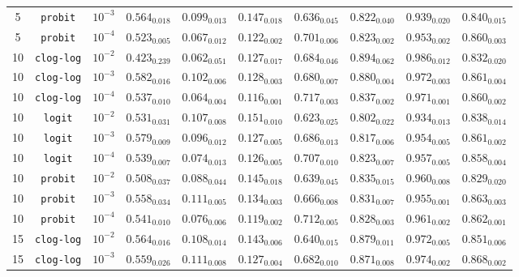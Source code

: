 \documentclass[preprint]{elsarticle}
\begin{document}
\begin{table}[!t]
{\begin{tabular}{c@{\hskip 0.15cm}c@{\hskip 0.15cm}c@{\hskip 0.15cm}c@{\hskip 0.15cm}c@{\hskip 0.15cm}c@{\hskip 0.15cm}c@{\hskip 0.15cm}c@{\hskip 0.15cm}c@{\hskip 0.15cm}c}
		5 & \texttt{probit} & $10^{-3}$ & $0.564_{0.018}$ & $0.099_{0.013}$ & $0.147_{0.018}$ & $0.636_{0.045}$ & $0.822_{0.040}$ & $0.939_{0.020}$ & $0.840_{0.015}$\\
		5 & \texttt{probit} & $10^{-4}$ & $0.523_{0.005}$ & $0.067_{0.012}$ & $0.122_{0.002}$ & $0.701_{0.006}$ & $0.823_{0.002}$ & $0.953_{0.002}$ & $0.860_{0.003}$\\
		10 & \texttt{clog-log} & $10^{-2}$ & $0.423_{0.239}$ & $0.062_{0.051}$ & $0.127_{0.017}$ & $0.684_{0.046}$ & $\mathbf{0.894_{0.062}}$ & $\mathbf{0.986_{0.012}}$ & $0.832_{0.020}$\\
		10 & \texttt{clog-log} & $10^{-3}$ & $\mathbf{0.582_{0.016}}$ & $0.102_{0.006}$ & $0.128_{0.003}$ & $0.680_{0.007}$ & $\mathit{0.880_{0.004}}$ & $0.972_{0.003}$ & $0.861_{0.004}$\\
		10 & \texttt{clog-log} & $10^{-4}$ & $0.537_{0.010}$ & $0.064_{0.004}$ & $\mathit{0.116_{0.001}}$ & $0.717_{0.003}$ & $0.837_{0.002}$ & $0.971_{0.001}$ & $0.860_{0.002}$\\
		10 & \texttt{logit} & $10^{-2}$ & $0.531_{0.031}$ & $0.107_{0.008}$ & $0.151_{0.010}$ & $0.623_{0.025}$ & $0.802_{0.022}$ & $0.934_{0.013}$ & $0.838_{0.014}$\\
		10 & \texttt{logit} & $10^{-3}$ & $0.579_{0.009}$ & $0.096_{0.012}$ & $0.127_{0.005}$ & $0.686_{0.013}$ & $0.817_{0.006}$ & $0.954_{0.005}$ & $0.861_{0.002}$\\
		10 & \texttt{logit} & $10^{-4}$ & $0.539_{0.007}$ & $0.074_{0.013}$ & $0.126_{0.005}$ & $0.707_{0.010}$ & $0.823_{0.007}$ & $0.957_{0.005}$ & $0.858_{0.004}$\\
		10 & \texttt{probit} & $10^{-2}$ & $0.508_{0.037}$ & $0.088_{0.044}$ & $0.145_{0.018}$ & $0.639_{0.045}$ & $0.835_{0.015}$ & $0.960_{0.008}$ & $0.829_{0.020}$\\
		10 & \texttt{probit} & $10^{-3}$ & $0.558_{0.034}$ & $\mathbf{0.111_{0.005}}$ & $0.134_{0.003}$ & $0.666_{0.008}$ & $0.831_{0.007}$ & $0.955_{0.001}$ & $0.863_{0.003}$\\
		10 & \texttt{probit} & $10^{-4}$ & $0.541_{0.010}$ & $0.076_{0.006}$ & $0.119_{0.002}$ & $0.712_{0.005}$ & $0.828_{0.003}$ & $0.961_{0.002}$ & $0.862_{0.001}$\\
		15 & \texttt{clog-log} & $10^{-2}$ & $0.564_{0.016}$ & $0.108_{0.014}$ & $0.143_{0.006}$ & $0.640_{0.015}$ & $0.879_{0.011}$ & $0.972_{0.005}$ & $0.851_{0.006}$\\
		15 & \texttt{clog-log} & $10^{-3}$ & $0.559_{0.026}$ & $\mathit{0.111_{0.008}}$ & $0.127_{0.004}$ & $0.682_{0.010}$ & $0.871_{0.008}$ & $\mathit{0.974_{0.002}}$ & $\mathbf{0.868_{0.002}}$\\

\end{tabular}}
\end{table}
\end{document}
